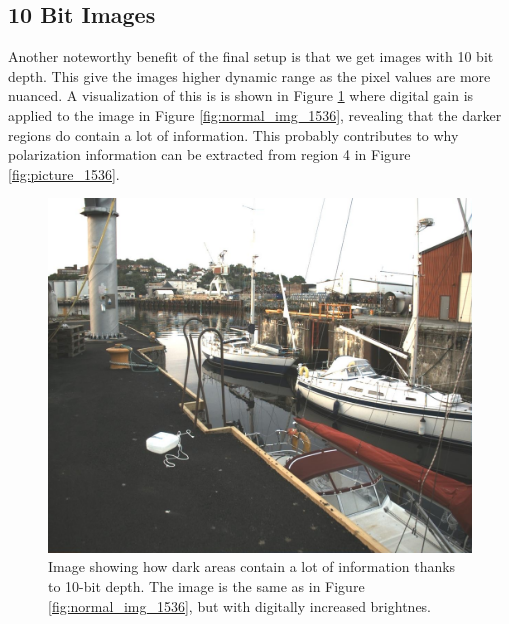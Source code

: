 \subsection{10 Bit Images}
Another noteworthy benefit of the final setup is that we get images with 10 bit depth.
This give the images higher dynamic range as the pixel values are more nuanced.
A visualization of this is is shown in Figure \ref{fig:gained_image} where digital gain is applied to the image in Figure \ref{fig:normal_img_1536}, revealing that the darker regions do contain a lot of information.
This probably contributes to why polarization information can be extracted from region 4 in Figure \ref{fig:picture_1536}.

\begin{figure}[H]
    \centering
    \includegraphics[width=.8\textwidth]{figures/pictures/gained_right_96.jpeg}
    \caption{Image showing how dark areas contain a lot of information thanks to 10-bit depth. The image is the same as in Figure \ref{fig:normal_img_1536}, but with digitally increased brightnes.}
    \label{fig:gained_image}
\end{figure}

